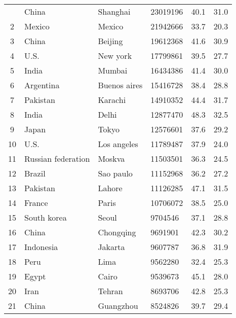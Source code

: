 \begin{center}
\begin{longtable}{clllcc}
        \hline
        \endlastfoot
   1 &               China &        Shanghai &   23019196 &     40.1 &     31.0 \\
   2 &              Mexico &          Mexico &   21942666 &     33.7 &     20.3 \\
   3 &               China &         Beijing &   19612368 &     41.6 &     30.9 \\
   4 &                U.S. &        New york &   17799861 &     39.5 &     27.7 \\
   5 &               India &          Mumbai &   16434386 &     41.4 &     30.0 \\
   6 &           Argentina &    Buenos aires &   15416728 &     38.4 &     28.8 \\
   7 &            Pakistan &         Karachi &   14910352 &     44.4 &     31.7 \\
   8 &               India &           Delhi &   12877470 &     48.3 &     32.5 \\
   9 &               Japan &           Tokyo &   12576601 &     37.6 &     29.2 \\
  10 &                U.S. &     Los angeles &   11789487 &     37.9 &     24.0 \\
  11 &  Russian federation &          Moskva &   11503501 &     36.3 &     24.5 \\
  12 &              Brazil &       Sao paulo &   11152968 &     36.2 &     27.2 \\
  13 &            Pakistan &          Lahore &   11126285 &     47.1 &     31.5 \\
  14 &              France &           Paris &   10706072 &     38.5 &     25.0 \\
  15 &         South korea &           Seoul &    9704546 &     37.1 &     28.8 \\
  16 &               China &       Chongqing &    9691901 &     42.3 &     30.2 \\
  17 &           Indonesia &         Jakarta &    9607787 &     36.8 &     31.9 \\
  18 &                Peru &            Lima &    9562280 &     32.4 &     25.3 \\
  19 &               Egypt &           Cairo &    9539673 &     45.1 &     28.0 \\
  20 &                Iran &          Tehran &    8693706 &     42.8 &     25.3 \\
  21 &               China &       Guangzhou &    8524826 &     39.7 &     29.4 \\

\end{longtable}
\end{center}
